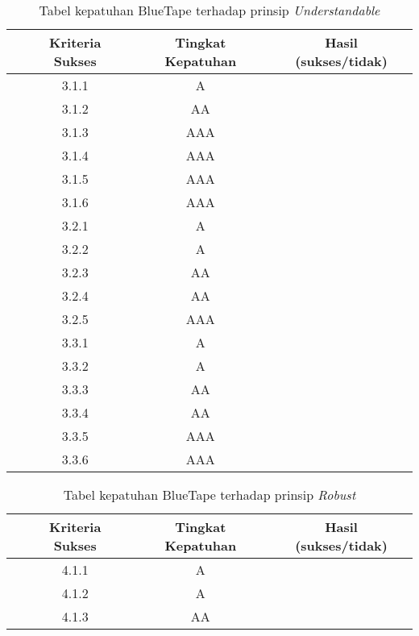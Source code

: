 \begin{table}[H]
    \centering 
    \caption{Tabel kepatuhan BlueTape terhadap prinsip \textit{Understandable}}
    \label{tab:kepatuhan_bluetape_understandable}
    \begin{tabular}{cccc}
        \toprule
        & Kriteria Sukses & Tingkat Kepatuhan & Hasil (sukses/tidak)\\

        \midrule
        & 3.1.1 & A & \\
        & 3.1.2 & AA & \\
        & 3.1.3 & AAA & \\
        & 3.1.4 & AAA & \\
        & 3.1.5 & AAA & \\
        & 3.1.6 & AAA & \\
        & 3.2.1 & A & \\
        & 3.2.2 & A & \\
        & 3.2.3 & AA & \\
        & 3.2.4 & AA & \\
        & 3.2.5 & AAA & \\
        & 3.3.1 & A & \\
        & 3.3.2 & A & \\
        & 3.3.3 & AA & \\
        & 3.3.4 & AA & \\
        & 3.3.5 & AAA & \\
        & 3.3.6 & AAA & \\

        \bottomrule

    \end{tabular}
\end{table}
\begin{table}[H]
    \centering 
    \caption{Tabel kepatuhan BlueTape terhadap prinsip \textit{Robust}}
    \label{tab:kepatuhan_bluetape_robust}
    \begin{tabular}{cccc}
        \toprule
        & Kriteria Sukses & Tingkat Kepatuhan & Hasil (sukses/tidak)\\

        \midrule
        & 4.1.1 & A & \\
        & 4.1.2 & A & \\
        & 4.1.3 & AA & \\

        \bottomrule
    
    \end{tabular} 
\end{table}
